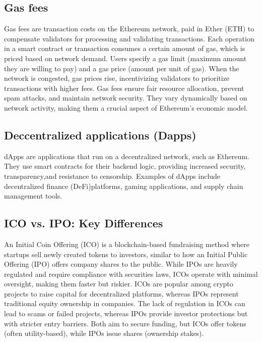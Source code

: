 \documentclass[12pt, a4paper]{article}
\begin{document}
\subsection{Gas fees}
Gas fees are transaction costs on the Ethereum network, paid in Ether (ETH) to compensate validators for processing and validating transactions. Each operation in a smart contract or transaction consumes a certain amount of gas, which is priced based on network demand. Users specify a gas limit (maximum amount they are willing to pay) and a gas price (amount per unit of gas). When the network is congested, gas prices rise, incentivizing validators to prioritize transactions with higher fees. Gas fees ensure fair resource allocation, prevent spam attacks, and maintain network security. They vary dynamically based on network activity, making them a crucial aspect of Ethereum's economic model.
\subsection{Deccentralized applications (Dapps)}
dApps are applications that run on a decentralized network, such as Ethereum. They use smart contracts for their backend logic, providing increased security, transparency,and resistance to censorship. Examples of dApps include decentralized finance (DeFi)platforms, gaming applications, and supply chain management tools.
\subsection{ICO vs. IPO: Key Differences}
An Initial Coin Offering (ICO) is a blockchain-based fundraising method where startups sell newly created tokens to investors, similar to how an Initial Public Offering (IPO) offers company shares to the public. While IPOs are heavily regulated and require compliance with securities laws, ICOs operate with minimal oversight, making them faster but riskier. ICOs are popular among crypto projects to raise capital for decentralized platforms, whereas IPOs represent traditional equity ownership in companies. The lack of regulation in ICOs can lead to scams or failed projects, whereas IPOs provide investor protections but with stricter entry barriers. Both aim to secure funding, but ICOs offer tokens (often utility-based), while IPOs issue shares (ownership stakes).
\end{document}
